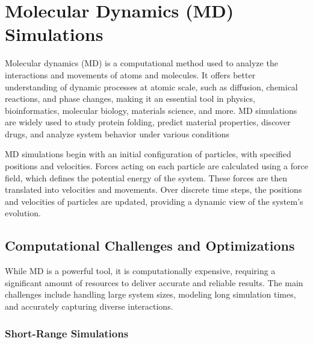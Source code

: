 
\section{Molecular Dynamics (MD) Simulations}

Molecular dynamics (MD) is a computational method used to analyze the interactions and movements of atoms and molecules. It offers better understanding of dynamic processes at atomic scale, such as diffusion, chemical reactions, and phase changes, making it an essential tool in physics, bioinformatics, molecular biology, materials science, and more. MD simulations are widely used to study protein folding, predict material properties, discover drugs, and analyze system behavior under various conditions \parencite{kukol2008molecular} \parencite{aktulga2012parallel}

MD simulations begin with an initial configuration of particles, with specified positions and velocities. Forces acting on each particle are calculated using a force field, which defines the potential energy of the system. These forces are then translated into velocities and movements. Over discrete time steps, the positions and velocities of particles are updated, providing a dynamic view of the system's evolution.


\subsection{Computational Challenges and Optimizations}

While MD is a powerful tool, it is computationally expensive, requiring a significant amount of resources to deliver accurate and reliable results. The main challenges include handling large system sizes, modeling long simulation times, and accurately capturing diverse interactions.

\subsubsection{Short-Range Simulations} \label{sec:shortrange}

